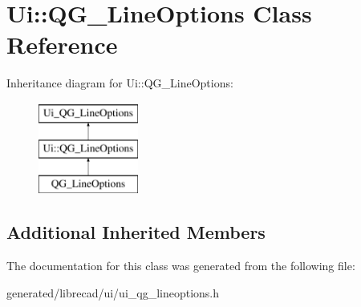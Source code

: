 \hypertarget{classUi_1_1QG__LineOptions}{\section{Ui\-:\-:Q\-G\-\_\-\-Line\-Options Class Reference}
\label{classUi_1_1QG__LineOptions}
}
Inheritance diagram for Ui\-:\-:Q\-G\-\_\-\-Line\-Options\-:\begin{figure}[H]
\begin{center}
\leavevmode
\includegraphics[height=3.000000cm]{classUi_1_1QG__LineOptions}
\end{center}
\end{figure}
\subsection*{Additional Inherited Members}


The documentation for this class was generated from the following file\-:\begin{DoxyCompactItemize}
\item 
generated/librecad/ui/ui\-\_\-qg\-\_\-lineoptions.\-h\end{DoxyCompactItemize}
